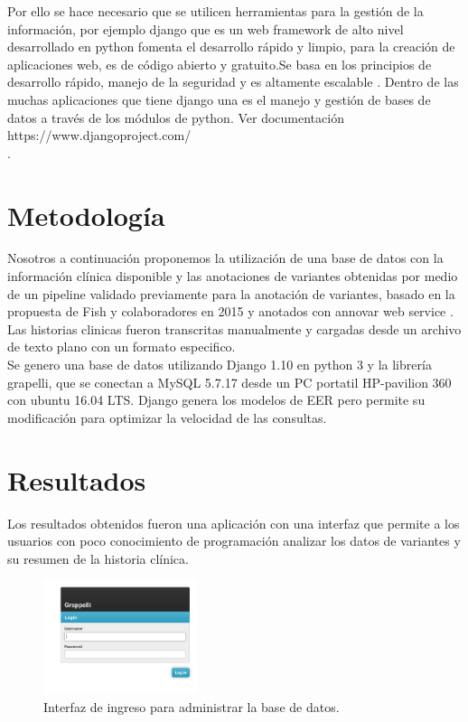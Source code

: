 Por ello se hace necesario que se utilicen herramientas para la gestión de la información, por ejemplo django que es un web framework de alto nivel desarrollado en python  fomenta el desarrollo rápido y limpio, para la creación de aplicaciones web, es de código abierto y gratuito.Se basa en los principios de desarrollo rápido, manejo de la seguridad y es altamente escalable . Dentro de las muchas aplicaciones que tiene django una es el manejo y gestión de bases de datos a través de los módulos de python. Ver documentación https://www.djangoproject.com/ \\.


\section{Metodología}

Nosotros a continuación proponemos la utilización de una base de datos con la información clínica disponible y las anotaciones de variantes obtenidas por medio de un pipeline validado previamente para la anotación de variantes, basado en la propuesta de Fish y colaboradores en 2015 \cite{Fisch2015} y anotados con annovar web service \cite{Yang2015}. Las historias clinicas fueron transcritas manualmente y cargadas desde un archivo de texto plano con un formato especifico.\\

Se genero una base de datos utilizando Django 1.10 en python 3 y la librería grapelli, que se conectan  a  MySQL  5.7.17 desde un PC portatil HP-pavilion 360 con ubuntu 16.04 LTS. Django genera los modelos de EER pero permite su modificación para optimizar la velocidad de las consultas. \\

\section{Resultados} 

Los resultados obtenidos fueron una aplicación con una interfaz que permite a los usuarios con poco conocimiento de  programación  analizar los datos de variantes y su resumen de la historia clínica. \\

\begin{figure}[h] 
	\centering
	\includegraphics[width=0.4\textwidth]{Kap3/admin_django}
	\caption{Interfaz de ingreso para  administrar la base de datos.} \label{fig:admin}
\end{figure}

